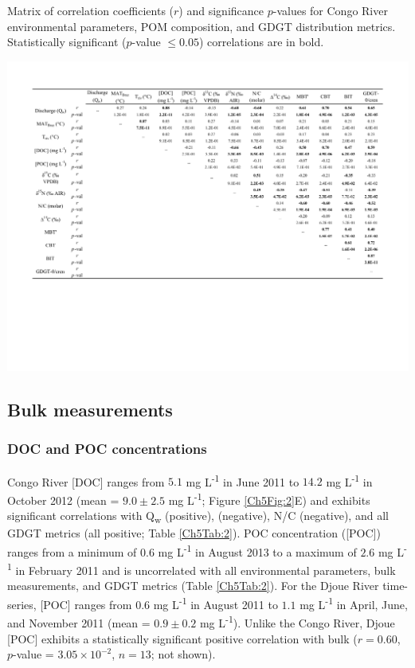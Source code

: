 \begin{table}
	\caption[Environmental parameter, POM, and GDGT correlation coefficients]{Matrix of correlation coefficients ($r$) and significance $p$-values for Congo River environmental parameters, POM composition, and GDGT distribution metrics. Statistically significant ($p$-value $\leq 0.05$) correlations are in bold.}
	\centering
		\includegraphics{Thesis_Tables/Ch5Tab2}
	\label{Ch5Tab:2} 
\end{table}

\subsection{Bulk measurements}

\subsubsection{DOC and POC concentrations}

Congo River [DOC] ranges from $5.1$ mg L\textsuperscript{-1} in June 2011 to $14.2$ mg L\textsuperscript{-1} in October 2012 (mean = $9.0 \pm 2.5$ mg L\textsuperscript{-1}; Figure \ref{Ch5Fig:2}E) and exhibits significant correlations with Q\textsubscript{w} (positive),  (negative), N/C (negative), and all GDGT metrics (all positive; Table \ref{Ch5Tab:2}). POC concentration ([POC]) ranges from a minimum of $0.6$ mg L\textsuperscript{-1} in August 2013 to a maximum of $2.6$ mg L\textsuperscript{-1} in February 2011 \citep[mean = $1.3 \pm 0.4$ mg L\textsuperscript{-1}; Figure \ref{Ch5Fig:2}F;][]{Hemingway:2016bq} and is uncorrelated with all environmental parameters, bulk measurements, and GDGT metrics (Table \ref{Ch5Tab:2}). For the Djoue River time-series, [POC] ranges from $0.6$ mg L\textsuperscript{-1} in August 2011 to $1.1$ mg L\textsuperscript{-1} in April, June, and November 2011 (mean = $0.9 \pm 0.2$ mg L\textsuperscript{-1}). Unlike the Congo River, Djoue [POC] exhibits a statistically significant positive correlation with bulk  ($r = 0.60$, $p$-value = $3.05 \times 10^{-2}$, $n = 13$; not shown).

